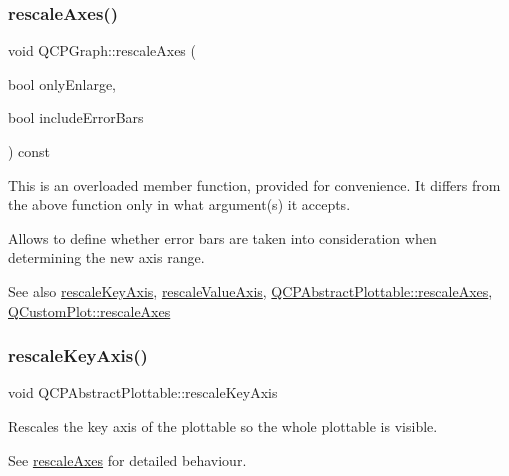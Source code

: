 \subsubsection{\texorpdfstring{rescale\+Axes()}{rescaleAxes()}\hspace{0.1cm}{\footnotesize\ttfamily [2/2]}}
{\footnotesize\ttfamily void Q\+C\+P\+Graph\+::rescale\+Axes (\begin{DoxyParamCaption}\item[{bool}]{only\+Enlarge,  }\item[{bool}]{include\+Error\+Bars }\end{DoxyParamCaption}) const}

This is an overloaded member function, provided for convenience. It differs from the above function only in what argument(s) it accepts.

Allows to define whether error bars are taken into consideration when determining the new axis range.

\begin{DoxySeeAlso}{See also}
\mbox{\hyperlink{class_q_c_p_graph_a051fb77b459ba1ae8d65552c67f45e94}{rescale\+Key\+Axis}}, \mbox{\hyperlink{class_q_c_p_graph_a9e0e620a56932c4df80a3762c2f93608}{rescale\+Value\+Axis}}, \mbox{\hyperlink{class_q_c_p_abstract_plottable_a1491c4a606bccd2d09e65e11b79eb882}{Q\+C\+P\+Abstract\+Plottable\+::rescale\+Axes}}, \mbox{\hyperlink{class_q_custom_plot_ad86528f2cee6c7e446dea4a6e8839935}{Q\+Custom\+Plot\+::rescale\+Axes}} 
\end{DoxySeeAlso}
\mbox{\label{class_q_c_p_graph_ae96b83c961e257da116c6acf9c7da308}} 
\subsubsection{\texorpdfstring{rescale\+Key\+Axis()}{rescaleKeyAxis()}\hspace{0.1cm}{\footnotesize\ttfamily [1/2]}}
{\footnotesize\ttfamily void Q\+C\+P\+Abstract\+Plottable\+::rescale\+Key\+Axis}

Rescales the key axis of the plottable so the whole plottable is visible.

See \mbox{\hyperlink{class_q_c_p_graph_a9c3909d6116e9d03978f057d41174e6a}{rescale\+Axes}} for detailed behaviour. \mbox{\label{class_q_c_p_graph_a051fb77b459ba1ae8d65552c67f45e94}} 
